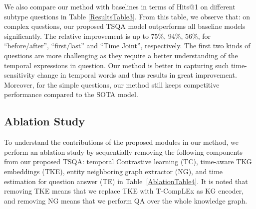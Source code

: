\documentclass[11pt]{article}
\begin{document}
\begin{table}[!ht]
    \centering
    \small
    \caption{Comparison of different models w.r.t. question type in terms of Hits@1.}
    \label{ResultsTable3}
\end{table}

We also compare our method with baselines in terms of Hits@1 on different subtype questions in Table \ref{ResultsTable3}. From this table, we observe that: on complex questions, our proposed TSQA model outperforms all baseline models significantly. The relative improvement is up to 75\%, 94\%, 56\%, for ``before/after'', ``first/last'' and ``Time Joint'', respectively. The first two kinds of questions are more challenging as they require a better understanding of the temporal expressions in question. Our method is better in capturing such time-sensitivity change in temporal words and thus results in great improvement. Moreover, for the simple questions, our method still keeps competitive performance compared to the SOTA model.














\subsection{Ablation Study}
To understand the contributions of the proposed modules in our method, we perform an ablation study by sequentially removing the following components from our proposed TSQA: temporal Contrastive learning (TC), time-aware TKG embeddings (TKE), entity neighboring graph extractor (NG), and time estimation for question answer (TE) in Table~\ref{AblationTable4}. It is noted that removing TKE means that we replace TKE with T-CompLEx as KG encoder, and removing NG means that we perform QA over the whole knowledge graph.
\end{document}
